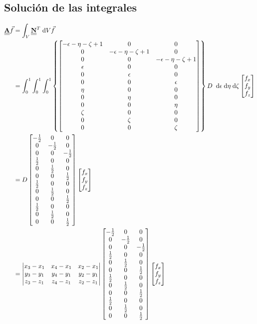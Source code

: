 \documentclass[12pt]{article}
\def\diffp[#1]#2{\frac{\partial#1}{\partial#2}}
\def\mt#1{\underline{\underline{\mathbf{#1}}}}
\newcommand{\vf}{\vec{f}}
\begin{document}
\newcommand{\nbe}{
\begin{bmatrix}
	N_1 & 0 & 0 &  N_2 & 0 & 0 &  N_3 & 0 & 0 &  N_4 & 0 & 0 \\
	0 & N_1 & 0 & 0 &  N_2 & 0 & 0 &  N_3 & 0 & 0 &  N_4 & 0 \\
	0 & 0 & N_1 & 0 & 0 &  N_2 & 0 & 0 &  N_3 & 0 & 0 &  N_4
\end{bmatrix}
}
\newcommand{\gradn}[1]{\diffp[#1]{x} + \diffp[#1]{y} + \diffp[#1]{z}}
\newcommand{\gradnbe}{
\begin{bmatrix}
	\gradn{N_1} & 0 & 0 &  \gradn{N_2} & 0 & 0 &  \gradn{N_3} & 0 & 0 &  \gradn{N_4} & 0 & 0 \\
	0 & \gradn{N_1} & 0 & 0 &  \gradn{N_2} & 0 & 0 &  \gradn{N_3} & 0 & 0 &  \gradn{N_4} & 0 \\
	0 & 0 & \gradn{N_1} & 0 & 0 &  \gradn{N_2} & 0 & 0 &  \gradn{N_3} & 0 & 0 &  \gradn{N_4}
\end{bmatrix}
}
\subsection{Soluci\'on de las integrales}

\begin{align*}
	\mt{A}\vf &= \A  \\
	&= \inteps \left\{\NTe\right\} D \deps \vfe \\
	&= D \NTesolved \vfe \\
	&= \Det \NTesolved \vfe
\end{align*}

\newpage
\end{document}
